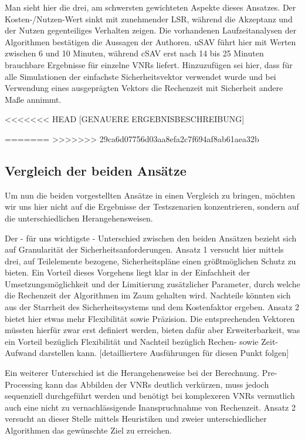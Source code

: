 \documentclass{lni}
\begin{document}
Man sieht hier die drei, am schwersten gewichteten Aspekte dieses Ansatzes. Der Kosten-/Nutzen-Wert sinkt mit zunehmender LSR, während die Akzeptanz und der Nutzen gegenteiliges Verhalten zeigen. Die vorhandenen Laufzeitanalysen der Algorithmen bestätigen die Aussagen der Authoren. uSAV führt hier mit Werten zwischen 6 und 10 Minuten, während cSAV erst nach 14 bis 25 Minuten brauchbare Ergebnisse für einzelne VNRs liefert. Hinzuzufügen sei hier, dass für alle Simulationen der einfachste Sicherheitsvektor verwendet wurde und bei Verwendung eines ausgeprägten Vektors die Rechenzeit mit Sicherheit andere Maße annimmt.

<<<<<<< HEAD
[GENAUERE ERGEBNISBESCHREIBUNG]

=======
>>>>>>> 29ca6d07756d03aa8efa2c7f694af8ab61aea32b
\subsection{Vergleich der beiden Ansätze}
\label{subsec:svne_vergleich}

Um nun die beiden vorgestellten Ansätze in einen Vergleich zu bringen, möchten wir uns hier nicht auf die Ergebnisse der Testszenarien konzentrieren, sondern auf die unterschiedlichen Herangehensweisen.

Der - für uns wichtigste - Unterschied zwischen den beiden Ansätzen bezieht sich auf Granularität der Sicherheitsanforderungen. Ansatz 1 versucht hier mittels drei, auf Teilelemente bezogene, Sicherheitspläne einen größtmöglichen Schutz zu bieten. Ein Vorteil dieses Vorgehens liegt klar in der Einfachheit der Umsetzungsmöglichkeit und der Limitierung zusätzlicher Parameter, durch welche die Rechenzeit der Algorithmen im Zaum gehalten wird. Nachteile könnten sich aus der Starrheit des Sicherheitssystems und dem Kostenfaktor ergeben. Ansatz 2 bietet hier etwas mehr Flexibilität sowie Präzision. Die entsprechenden Vektoren müssten hierfür zwar erst definiert werden, bieten dafür aber Erweiterbarkeit, was ein Vorteil bezüglich Flexibilität und Nachteil bezüglich Rechen- sowie Zeit-Aufwand darstellen kann. [detailliertere Ausführungen für diesen Punkt folgen]

Ein weiterer Unterschied ist die Herangehensweise bei der Berechnung. Pre-Processing kann das Abbilden der VNRs deutlich verkürzen, muss jedoch sequenziell durchgeführt werden und benötigt bei komplexeren VNRs vermutlich auch eine nicht zu vernachlässigende Inanspruchnahme von Rechenzeit. Ansatz 2 versucht an dieser Stelle mittels Heuristiken und zweier unterschiedlicher Algorithmen das gewünschte Ziel zu erreichen.
\end{document}
